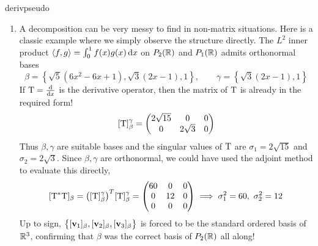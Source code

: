 \begin{examples}{}{derivpseudo}
\begin{enumerate}
  
  \pagebreak[3]
  
	  \item\label{ex:derivpseudo2} A decomposition can be very messy to find in non-matrix situations. Here is a classic example where we simply observe the structure directly.\smallbreak
	  The $L^2$ inner product $\left\langle f,g\right\rangle=\int_0^1f(x)g(x)\,{\mathrm{d} x}$ on $P_2(\mathbb{R})$ and $P_1(\mathbb{R})$ admits orthonormal bases
		\[
			\beta=\left\{\sqrt 5(6x^2-6x+1),\sqrt 3(2x-1),1\right\},\qquad 
			\gamma=\left\{\sqrt 3(2x-1),1\right\}
		\]
		If $\mathrm{T}=\frac{\mathrm{d} }{\mathrm{d} x}$ is the derivative operator, then the matrix of $\mathrm{T}$ is already in the required form!
		\[
			[\mathrm{T}]_\beta^\gamma=
			\begin{pmatrix}
				2\sqrt{15}&0&0\\
				0&2\sqrt 3&0
			\end{pmatrix}
		\]
		Thus $\beta,\gamma$ are suitable bases and the singular values of $\mathrm{T}$ are $\sigma_1=2\sqrt{15}$ and $\sigma_2=2\sqrt 3$.\smallbreak
		Since $\beta,\gamma$ are orthonormal, we could have used the adjoint method to evaluate this directly,
		\[
			[\mathrm{T}^*\mathrm{T}]_\beta =\big([\mathrm{T}]_\beta^\gamma\big)^T[\mathrm{T}]_\beta^\gamma=
			\begin{pmatrix}
				60&0&0\\
				0&12&0\\
				0&0&0
			\end{pmatrix}
			\implies \sigma_1^2=60,\ \sigma_2^2=12
		\]
		Up to sign, $\big\{[{\mathbf{v}}_1]_\beta,[{\mathbf{v}}_2]_\beta,[{\mathbf{v}}_3]_\beta\big\}$ is forced to be the standard ordered basis of $\mathbb{R}^3$, confirming that $\beta$ was the correct basis of $P_2(\mathbb{R})$ all along!
	\end{enumerate}
\end{examples}



